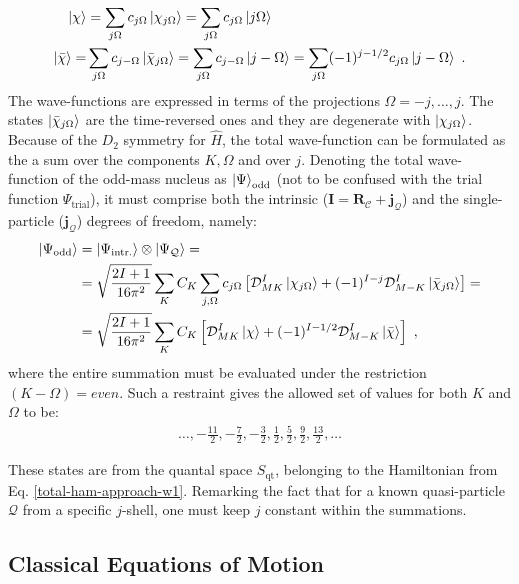 \begin{align}
    \ket{\chi}&=\sum_{j\Omega}c_{j\Omega}\ket{\chi_{j\Omega}}=\sum_{j\Omega}c_{j\Omega}\ket{j\Omega}\nonumber\\
    \ket{\bar{\chi}}=&\sum_{j\Omega}c_{j-\Omega}\ket{\bar{\chi}_{j\Omega}}=\sum_{j\Omega}c_{j-\Omega}\ket{j-\Omega}=\sum_{j\Omega}(-1)^{j-1/2}c_{j\Omega}\ket{j-\Omega}\ .
    \label{j-Omega-single-particle-states}
\end{align}
The wave-functions are expressed in terms of the projections $\Omega=-j,\dots,j$. The states $\ket{\bar{\chi}_{j\Omega}}$ are the time-reversed ones and they are degenerate with $\ket{\chi_{j\Omega}}$. Because of the $D_2$ symmetry for $\hat{H}$, the total wave-function can be formulated as the a sum over the components $K, \Omega$ and over $j$. Denoting the total wave-function of the odd-mass nucleus as $\ket{\Psi}_\text{odd}$ (not to be confused with the trial function $\Psi_\text{trial}$), it must comprise both the intrinsic ($\mathbf{I}=\mathbf{R}_\mathscr{C}+\mathbf{j}_\mathcal{Q}$) and the single-particle ($\mathbf{j}_\mathcal{Q}$) degrees of freedom, namely:
\begin{align}
    \ket{\Psi_\text{odd}}&=\ket{\Psi_\text{intr.}}\otimes\ket{\Psi_\mathcal{Q}}=\nonumber\\
    &=\sqrt{\frac{2I+1}{16\pi^2}}\sum_K C_K\sum_{j,\Omega}c_{j\Omega}\left[\mathcal{D}_{MK}^I\ket{\chi_{j\Omega}}+(-1)^{I-j}\mathcal{D}_{M-K}^I\ket{\bar{\chi}_{j\Omega}}\right]=\nonumber\\
    &=\sqrt{\frac{2I+1}{16\pi^2}}\sum_K C_K \left[\mathcal{D}_{MK}^I\ket{\chi}+(-1)^{I-1/2}\mathcal{D}_{M-K}^I\ket{\bar{\chi}}\right]\ ,
    \label{total-wavefunction-oddA-general}
\end{align}
where the entire summation must be evaluated under the restriction $(K-\Omega)=even$. Such a restraint gives the allowed set of values for both $K$ and $\Omega$ to be:
\begin{align}
    \dots,-\frac{11}{2},-\frac{7}{2},-\frac{3}{2},\frac{1}{2},\frac{5}{2},\frac{9}{2},\frac{13}{2},\dots
\end{align}

These states are from the quantal space $S_\text{qt}$, belonging to the Hamiltonian from Eq. \ref{total-ham-approach-w1}. Remarking the fact that for a known quasi-particle $\mathcal{Q}$ from a specific $j$-shell, one must keep $j$ constant within the summations.

\subsection{Classical Equations of Motion}
\label{equations-of-motion-section}

